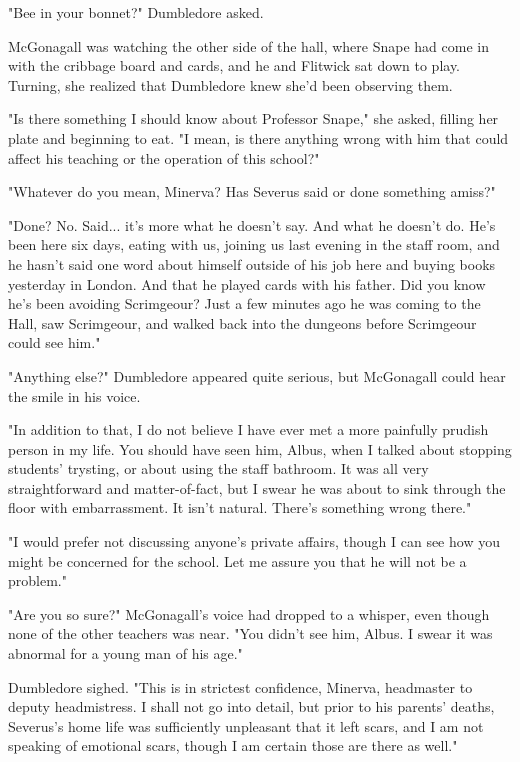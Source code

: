 \documentclass[a4paper,11pt]{article}
\begin{document}
"Bee in your bonnet?" Dumbledore asked.

McGonagall was watching the other side of the hall, where Snape had come in with the cribbage board and cards, and he and Flitwick sat down to play. Turning, she realized that Dumbledore knew she'd been observing them.

"Is there something I should know about Professor Snape," she asked, filling her plate and beginning to eat. "I mean, is there anything wrong with him that could affect his teaching or the operation of this school?"

"Whatever do you mean, Minerva? Has Severus said or done something amiss?"

"Done? No. Said... it's more what he doesn't say. And what he doesn't do. He's been here six days, eating with us, joining us last evening in the staff room, and he hasn't said one word about himself outside of his job here and buying books yesterday in London. And that he played cards with his father. Did you know he's been avoiding Scrimgeour? Just a few minutes ago he was coming to the Hall, saw Scrimgeour, and walked back into the dungeons before Scrimgeour could see him."

"Anything else?" Dumbledore appeared quite serious, but McGonagall could hear the smile in his voice.

"In addition to that, I do not believe I have ever met a more painfully prudish person in my life. You should have seen him, Albus, when I talked about stopping students' trysting, or about using the staff bathroom. It was all very straightforward and matter-of-fact, but I swear he was about to sink through the floor with embarrassment. It isn't natural. There's something wrong there."

"I would prefer not discussing anyone's private affairs, though I can see how you might be concerned for the school. Let me assure you that he will not be a problem."

"Are you so sure?" McGonagall's voice had dropped to a whisper, even though none of the other teachers was near. "You didn't see him, Albus. I swear it was abnormal for a young man of his age."

Dumbledore sighed. "This is in strictest confidence, Minerva, headmaster to deputy headmistress. I shall not go into detail, but prior to his parents' deaths, Severus's home life was sufficiently unpleasant that it left scars, and I am not speaking of emotional scars, though I am certain those are there as well."
\end{document}
